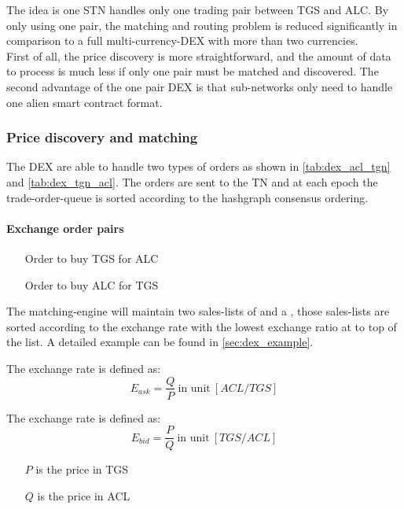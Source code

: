 The idea is one STN handles only one trading pair between TGS and ALC. By only using one pair, the matching and routing problem is reduced significantly in comparison to a full multi-currency-DEX with more than two currencies.\\
First of all, the price discovery is more straightforward, and the amount of data to process is much less if only one pair must be matched and discovered. The second advantage of the one pair DEX is that sub-networks only need to handle one alien smart contract format.\\

\subsubsection{Price discovery and matching}

The DEX are able to handle two types of orders as shown in \cref{tab:dex_acl_tgn} and \cref{tab:dex_tgn_acl}.
The orders are sent to the TN and at each epoch the trade-order-queue is sorted according to the hashgraph consensus ordering. 
\paragraph{Exchange order pairs}
\begin{itemize}
 \item[\bfit{ATO}] Order to buy TGS for ALC
 \item[\bfit{BTO}] Order to buy ALC for TGS
\end{itemize}

The matching-engine will maintain two sales-lists of  and a , those sales-lists are sorted according to the exchange rate with the lowest exchange ratio at to top of the list. A detailed example can be found in \cref{sec:dex_example}.


The  exchange rate is defined as:
\begin{equation}
 E_{ask} = \frac{Q}{P} ~\text{in unit} ~\left[ ACL/TGS \right]
\end{equation}

The  exchange rate is defined as:
\begin{equation}
 E_{bid} = \frac{P}{Q}~\text{in unit} ~\left[ TGS/ACL \right]
\end{equation}

\begin{itemize}
 \item[$P$]is the price in TGS
 \item[$Q$]is the price in ACL
\end{itemize}


